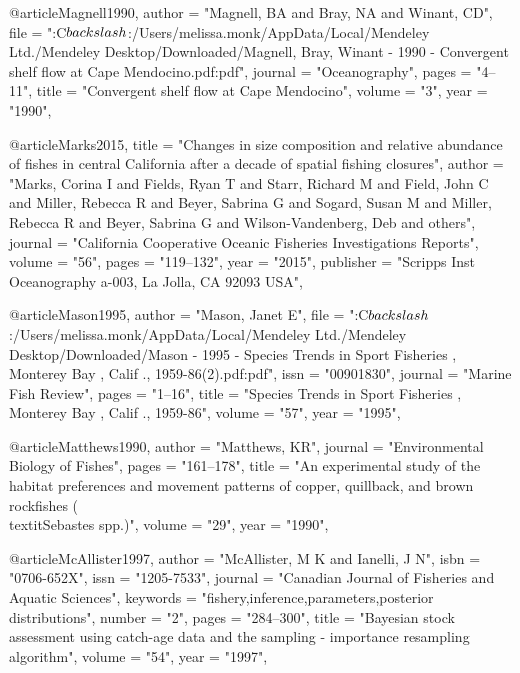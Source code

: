 {@article{Magnell1990,
    author = "{Magnell, BA and Bray, NA and Winant, CD}",
    file = "{:C$\\backslash$:/Users/melissa.monk/AppData/Local/Mendeley Ltd./Mendeley Desktop/Downloaded/Magnell, Bray, Winant - 1990 - Convergent shelf flow at Cape Mendocino.pdf:pdf}",
    journal = "{Oceanography}",
    pages = "{4--11}",
    title = "{{Convergent shelf flow at Cape Mendocino}}",
    volume = "{3}",
    year = "{1990}",
}

@article{Marks2015,
    title = "{Changes in size composition and relative abundance of fishes in central California after a decade of spatial fishing closures}",
    author = "{Marks, Corina I and Fields, Ryan T and Starr, Richard M and Field, John C and Miller, Rebecca R and Beyer, Sabrina G and Sogard, Susan M and Miller, Rebecca R and Beyer, Sabrina G and Wilson-Vandenberg, Deb and others}",
    journal = "{California Cooperative Oceanic Fisheries Investigations Reports}",
    volume = "{56}",
    pages = "{119--132}",
    year = "{2015}",
    publisher = "{Scripps Inst Oceanography a-003, La Jolla, CA 92093 USA}",
}

@article{Mason1995,
    author = "{Mason, Janet E}",
    file = "{:C$\\backslash$:/Users/melissa.monk/AppData/Local/Mendeley Ltd./Mendeley Desktop/Downloaded/Mason - 1995 - Species Trends in Sport Fisheries , Monterey Bay , Calif ., 1959-86(2).pdf:pdf}",
    issn = "{00901830}",
    journal = "{Marine Fish Review}",
    pages = "{1--16}",
    title = "{{Species Trends in Sport Fisheries , Monterey Bay , Calif ., 1959-86}}",
    volume = "{57}",
    year = "{1995}",
}

@article{Matthews1990,
    author = "{Matthews, KR}",
    journal = "{Environmental Biology of Fishes}",
    pages = "{161--178}",
    title = "{{An experimental study of the habitat preferences and movement patterns of copper, quillback, and brown rockfishes (\\textit{{Sebastes}} spp.)}}",
    volume = "{29}",
    year = "{1990}",
}

@article{McAllister1997,
    author = "{McAllister, M K and Ianelli, J N}",
    isbn = "{0706-652X}",
    issn = "{1205-7533}",
    journal = "{Canadian Journal of Fisheries and Aquatic Sciences}",
    keywords = "{fishery,inference,parameters,posterior distributions}",
    number = "{2}",
    pages = "{284--300}",
    title = "{{Bayesian stock assessment using catch-age data and the sampling - importance resampling algorithm}}",
    volume = "{54}",
    year = "{1997}",
}

}
